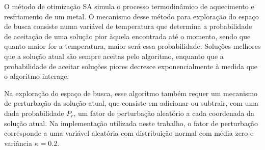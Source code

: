 O  método de otimização \ac{SA} simula o processo termodinâmico de aquecimento e resfriamento de um metal. O mecanismo desse método para exploração do espaço de busca consiste numa variável de temperatura que determina a probabilidade de aceitação de uma solução pior àquela encontrada até o momento, sendo que quanto maior for a temperatura, maior será essa probabilidade. Soluções melhores que a solução atual são sempre aceitas pelo algoritmo, enquanto que a probabilidade de aceitar soluções piores decresce exponencialmente à medida que o algoritmo interage.  

Na exploração do espaço de busca, esse algoritmo também requer um mecanismo de perturbação da solução atual, que consiste em adicionar ou subtrair, com uma dada probabilidade $P_r$, um fator de perturbação aleatório a cada coordenada da solução atual. Na implementação utilizada neste trabalho, o fator de perturbação corresponde a uma variável aleatória com distribuição normal com média zero e variância $\kappa = 0.2$.

\begin{comment}
\begin{algorithm}[ht]
\caption{Simulated Annealing}
\label{alg:sa}
\begin{algorithmic}
\Require $N\text{,}\:M\text{,}\:T_0\text{,}\:P\text{,}\:L> 0$, $:\alpha\text{,}\:\kappa\text{,}\:P_r \in [0,1]$, $\:COST$.
\Ensure The best found solution that minimizes $COST$.

\Function{DISTURB}{$\boldsymbol{v}$}
\State $f \gets$ \Call{$COST$}{$\boldsymbol{v}$}
\For{$i = 0,\:1,\:\cdots,\:M-1$} 
\If {$P_r > U(0,1)$}
\State $aux \gets v[i]$
\State $v[i] \gets v[i]+ \kappa.(1+f).\mathcal{N}(0,1).v[i]$
\If {$v[i] \notin [0.125,125.5]$}
\State $v[i] \gets aux$
\EndIf
\EndIf
\EndFor
\State \Return $\boldsymbol{v}$
\EndFunction

\State $i \gets 1$, $n \gets 0$,$T \gets T_0$
\For{$j = 0,\:1,\:\cdots,\:M-1$} 
\State $s[j] \gets U(0.125,125.5)$
\EndFor
\State $fit \gets$ \Call{$COST$}{$\boldsymbol{s}$} 
\Repeat
\State $\boldsymbol{s_d} \gets$ \Call{$Disturb$}{$\boldsymbol{s}$}
\State $\delta \gets$ \Call{$COST$}{$\boldsymbol{s_d}$}$- fit$ 
\If {$\delta < 0$ or $\exp{(\frac{\delta}{T})} > U(0,1)$}
\State $\boldsymbol{s} \gets \boldsymbol{s_d}$,$fit \gets $ \Call{$COST$}{$\boldsymbol{s_d}$}
$n \gets n + 1$
\EndIf
\State $i \gets i + 1$
\Until{$i > P$ or $n > L$}
\State $T \gets \alpha.T$
\end{algorithmic}
\end{algorithm}
\end{comment}

